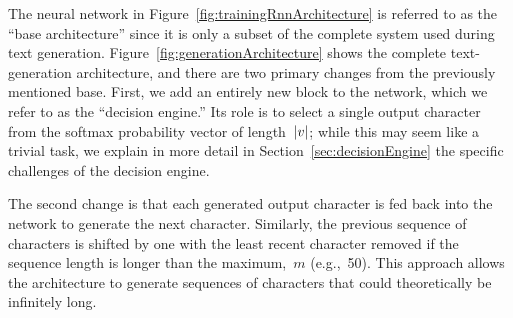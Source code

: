 \documentclass{article}
\DeclarePairedDelimiter\abs{\lvert}{\rvert}%
\begin{document}
The neural network in Figure~\ref{fig:trainingRnnArchitecture} is referred to as the ``base architecture'' since it is only a subset of the complete system used during text generation.  Figure~\ref{fig:generationArchitecture} shows the complete text-generation architecture, and there are two primary changes from the previously mentioned base.  First, we add an entirely new block to the network, which we refer to as the ``decision engine.''  Its role is to select a single output character from the softmax probability vector of length~$\abs*{v}$; while this may seem like a trivial task, we explain in more detail in Section~\ref{sec:decisionEngine} the specific challenges of the decision engine. 

The second change is that each generated output character is fed back into the network to generate the next character.  Similarly, the previous sequence of characters is shifted by one with the least recent character removed if the sequence length is longer than the maximum,~$m$ (e.g.,~50).  This approach allows the architecture to generate sequences of characters that could theoretically be infinitely long.
\end{document}
